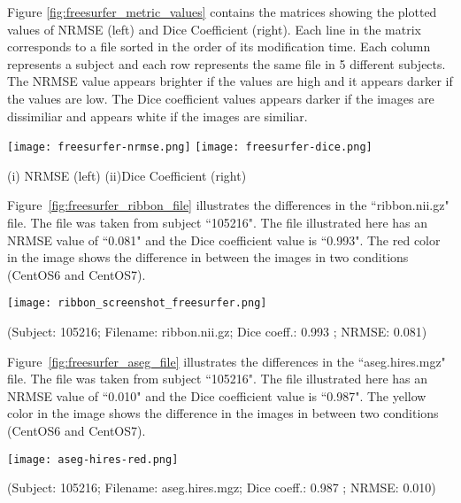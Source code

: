 Figure \ref{fig:freesurfer_metric_values} contains the matrices showing the plotted values of NRMSE (left) and Dice Coefficient (right). Each line in the matrix corresponds to a file sorted in the order of its modification time. Each column represents a subject and each row represents the same file in 5 different subjects. The NRMSE value appears brighter if the values are high and it appears darker if the values are low. The Dice coefficient values appears darker if the images are dissimiliar and appears white if the images are similiar.

\begin{center}
\texttt{[image: freesurfer-nrmse.png]}%
\texttt{[image: freesurfer-dice.png]}
\caption*{(i) NRMSE (left) (ii)Dice Coefficient (right)}
\label{fig:freesurfer_metric_values}
\end{center}

Figure~\ref{fig:freesurfer_ribbon_file} illustrates the differences in the ``ribbon.nii.gz" file. The file was taken from subject ``105216". The file illustrated here has an NRMSE value of ``0.081" and the Dice coefficient value is ``0.993". The red color in the image shows the difference in between the images in two conditions (CentOS6 and CentOS7).
\hfill \break
\begin{center}
\texttt{[image: ribbon\_screenshot\_freesurfer.png]}
\caption*{(Subject: 105216; Filename: ribbon.nii.gz; Dice coeff.: 0.993 ; NRMSE: 0.081)}
\label{fig:freesurfer_ribbon_file}
\end{center}
\hfill \break

Figure~\ref{fig:freesurfer_aseg_file} illustrates the differences in the ``aseg.hires.mgz" file. The file was taken from subject ``105216". The file illustrated here has an NRMSE value of ``0.010" and the Dice coefficient value is ``0.987". The yellow color in the image shows the difference in the images in between two conditions (CentOS6 and CentOS7).
\hfill \break
\begin{center}
\texttt{[image: aseg-hires-red.png]}
\caption*{(Subject: 105216; Filename: aseg.hires.mgz; Dice coeff.: 0.987 ; NRMSE: 0.010)}
\label{fig:freesurfer_aseg_file}
\end{center}
\hfill \break

